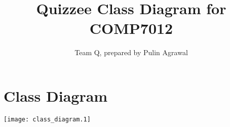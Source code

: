 \documentclass[letterpaper,10pt]{article}
\title{Quizzee Class Diagram for COMP7012}
\author{Team Q, prepared by Pulin Agrawal}
\begin{document}
\maketitle

\section{Class Diagram}

\texttt{[image: class\_diagram.1]}
\end{document}
